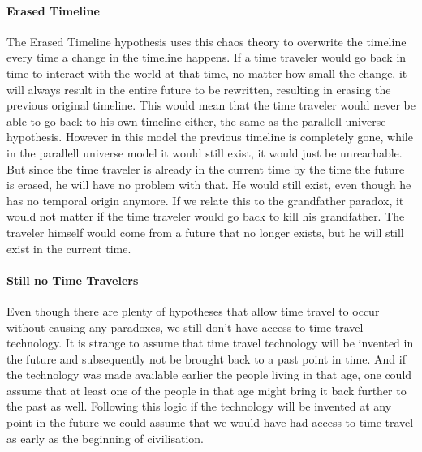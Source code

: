 \paragraph{Erased Timeline}
The Erased Timeline hypothesis uses this chaos theory to overwrite the timeline  every time a change in the timeline happens. If a time traveler would go back in time to interact with the world at that time, no matter how small the change, it will always result in the entire future to be rewritten, resulting in erasing the previous original timeline. This would mean that the time traveler would never be able to go back to his own timeline either, the same as the parallell universe hypothesis. However in this model the previous timeline is completely gone, while in the parallell universe model it would still exist, it would just be unreachable. But since the time traveler is already in the current time by the time the future is erased, he will have no problem with that. He would still exist, even though he has no temporal origin anymore. If we relate this to the grandfather paradox, it would not matter if the time traveler would go back to kill his grandfather. The traveler himself would come from a future that no longer exists, but he will still exist in the current time.
\paragraph{Still no Time Travelers}
Even though there are plenty of hypotheses that allow time travel to occur without causing any paradoxes, we still don't have access to time travel technology. It is strange to assume that time travel technology will be invented in the future and subsequently not be brought back to a past point in time. And if the technology was made available earlier the people living in that age, one could assume that at least one of the people in that age might bring it back further to the past as well. Following this logic if the technology will be invented at any point in the future we could assume that we would have had access to time travel as early as the beginning of civilisation.
